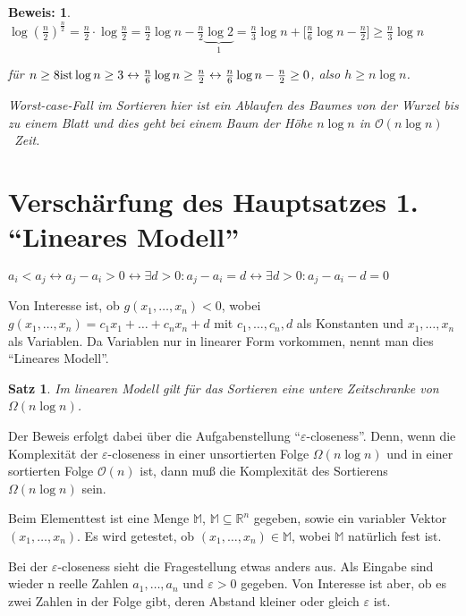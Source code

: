 \documentclass[ngerman,draft,parskip=half*,twoside]{scrreprt}
\theoremstyle{break}
\newtheorem{satz}{Satz}[chapter]
\theoremstyle{nonumberbreak}
\newtheorem{beweis}{Beweis:}
\newcommand*{\OO}{\mathcal{O}}      %
\newcommand*{\M}{\mathbb{M}}
\newcommand*{\R}{\mathbb{R}}        %
\begin{document}
\begin{beweis}
$\log \left(\frac{n}{2}\right)^{\frac{n}{2}} = \frac{n}{2} \cdot \log \frac{n}{2} = \frac{n}{2} \log n - \frac{n}{2}
\underbrace{\log 2}_{1} = \frac{n}{3} \log n + \lbrack \frac{n}{6} \log n - \frac{n}{2} \rbrack \geq \frac {n}{3} \log n $ 

für $ n \geq 8\textup{ist}\log n \geq 3 \leftrightarrow \frac{n}{6} \log n \geq \frac {n}{2} 
\leftrightarrow \frac{n}{6} \log n - \frac{n}{2} \geq 0$, also $h \geq n \log n$.

Worst-case-Fall im Sortieren hier ist ein Ablaufen des Baumes von der Wurzel bis zu einem Blatt und dies geht bei einem Baum der Höhe $n
\log n$ in $\OO(n \log n)$~Zeit.
\end{beweis}

\section{Verschärfung des Hauptsatzes 1. "`Lineares Modell"'}

$ a_i < a_j \leftrightarrow a_j - a_i > 0
\leftrightarrow \exists  d > 0 : a_j - a_i = d
\leftrightarrow \exists   d > 0 : a_j - a_i - d = 0 $ 


Von Interesse ist, ob $ g(x_1 , \dots , x_n) < 0 $, wobei $ g(x_1 , \dots , x_n) = c_1 x_1 + \dots + c_n x_n + d $ mit
$ c_1, \dots , c_n, d $ als Konstanten und $ x_1, \dots, x_n  $ als Variablen.
Da Variablen nur in linearer Form vorkommen, nennt man dies "`Lineares Modell"'.

\begin{satz}
Im linearen Modell gilt für das Sortieren eine untere Zeitschranke von $ \Omega (n \log n) $.
\end{satz}
		
Der Beweis erfolgt dabei über die Aufgabenstellung "`$\varepsilon$-closeness"'. Denn, wenn die Komplexität der $\varepsilon$-closeness
in einer unsortierten Folge $\Omega(n\log n)$ und in einer sortierten Folge $\OO(n)$ ist, dann muß die Komplexität des
Sortierens $\Omega (n \log n)$ sein.
		
Beim Elementtest ist eine Menge $ \M $, $ \M \subseteq \R^n$ gegeben, sowie ein variabler Vektor $
(x_1, \dots , x_n) $. Es wird getestet, ob $ (x_1, \dots , x_n) \in \M $, wobei $ \M $ natürlich fest ist. 
	
Bei der $\varepsilon$-closeness sieht die Fragestellung etwas anders aus. Als Eingabe sind wieder n reelle Zahlen $a_1, \dots , a_n $
und $ \varepsilon > 0 $ gegeben. Von Interesse ist aber, ob es zwei Zahlen in der Folge gibt, deren Abstand kleiner oder gleich
$\varepsilon$ ist.
\end{document}
